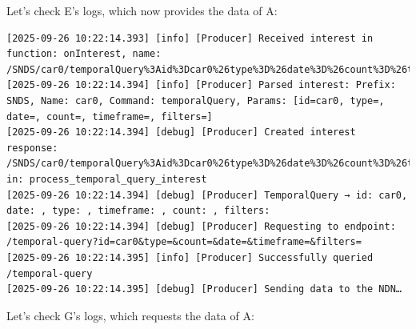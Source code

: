 \documentclass{article}
\begin{document}
Let's check E's logs, which now provides the data of A:

\begin{lstlisting}[language=log, caption={E's logs after becoming the provider of A's data}, label={lst:e-after-failure-producer}]
[2025-09-26 10:22:14.393] [info] [Producer] Received interest in function: onInterest, name: /SNDS/car0/temporalQuery%3Aid%3Dcar0%26type%3D%26date%3D%26count%3D%26timeframe%3D%26filters%3D
[2025-09-26 10:22:14.394] [info] [Producer] Parsed interest: Prefix: SNDS, Name: car0, Command: temporalQuery, Params: [id=car0, type=, date=, count=, timeframe=, filters=]
[2025-09-26 10:22:14.394] [debug] [Producer] Created interest response: /SNDS/car0/temporalQuery%3Aid%3Dcar0%26type%3D%26date%3D%26count%3D%26timeframe%3D%26filters%3D in: process_temporal_query_interest
[2025-09-26 10:22:14.394] [debug] [Producer] TemporalQuery → id: car0, date: , type: , timeframe: , count: , filters: 
[2025-09-26 10:22:14.394] [debug] [Producer] Requesting to endpoint: /temporal-query?id=car0&type=&count=&date=&timeframe=&filters=
[2025-09-26 10:22:14.395] [info] [Producer] Successfully queried /temporal-query
[2025-09-26 10:22:14.395] [debug] [Producer] Sending data to the NDN…
\end{lstlisting}

Let's check G's logs, which requests the data of A:
\end{document}
